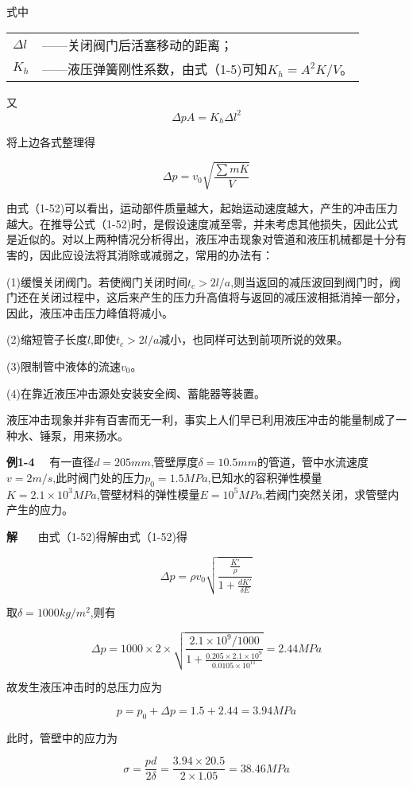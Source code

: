\noindent 式中
\begin{tabular}[t]{ll}
       $\varDelta l$ & ——关闭阀门后活塞移动的距离；\\
       $K_h$ & ——液压弹簧刚性系数，由式（1-5)可知$K_h=A^2K/V$。

\end{tabular}   

\noindent  又
$$
\varDelta pA=K_h\varDelta l^2
$$

将上边各式整理得

$$
\varDelta p=v_0\sqrt{\frac{\sum{mK}}{V}}
$$

由式（1-52)可以看出，运动部件质量越大，起始运动速度越大，产生的冲击压力越大。在推导公式（1-52)时，是假设速度减至零，并未考虑其他损失，因此公式是近似的。对以上两种情况分析得出，液压冲击现象对管道和液压机械都是十分有害的，因此应设法将其消除或减弱之，常用的办法有：

(1)缓慢关闭阀门。若使阀门关闭时间$t_c>2l/a$,则当返回的减压波回到阀门时，阀门还在关闭过程中，这后来产生的压力升高值将与返回的减压波相抵消掉一部分，因此，液压冲击压力峰值将减小。

(2)缩短管子长度$l$,即使$t_c>2l/a$减小，也同样可达到前项所说的效果。

(3)限制管中液体的流速$v_0$。

(4)在靠近液压冲击源处安装安全阀、蓄能器等装置。

液压冲击现象并非有百害而无一利，事实上人们早已利用液压冲击的能量制成了一种水、锤泵，用来扬水。

\textbf{例1-4} \ \ 
有一直径$d=205mm$,管壁厚度$\delta =10.5mm$的管道，管中水流速度$v=2m/s$,此时阀门处的压力$p_0=1.5MPa$,已知水的容积弹性模量$K=2.1×10^3MPa$,管壁材料的弹性模量$E=10^5MPa$,若阀门突然关闭，求管壁内产生的应力。

\textbf{解} \ \ \   
由式（1-52)得解由式（1-52)得

$$
\varDelta p=\rho v_0\sqrt{\frac{\frac{K'}{\rho}}{1+\frac{dK'}{\delta E}}}
$$

\noindent 取$\delta =1000kg/m^2$,则有

$$
\varDelta p=1000\times 2\times \sqrt{\frac{2.1\times 10^9/1000}{1+\frac{0.205\times 2.1\times 10^9}{0.0105\times 10^{11}}}}=2.44MPa
$$

\noindent 故发生液压冲击时的总压力应为

$$
p=p_0+\varDelta p=1.5+2.44=3.94MPa
$$

\noindent 此时，管壁中的应力为

$$
\sigma =\frac{pd}{2\delta}=\frac{3.94\times 20.5}{2\times 1.05}=38.46MPa
$$

